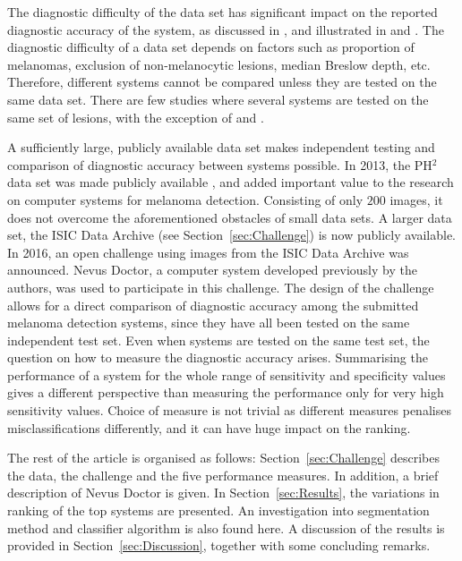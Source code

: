 \documentclass[10pt,letterpaper]{article}
\begin{document}
The diagnostic difficulty of the data set has significant impact on the reported diagnostic accuracy of the system, as discussed in \cite{Rosado2003Accuracy}, and illustrated in \cite{Malvehy2014Clinical} and \cite{Mollersen2015Computeraided}. 
The diagnostic difficulty of a data set depends on factors such as proportion of melanomas, exclusion of non-melanocytic lesions, median Breslow depth, etc. 
Therefore, different systems cannot be compared unless they are tested on the same data set. 
There are few studies where several systems are tested on the same set of lesions, with the exception of \cite{Perrinaud2007Can} and \cite{Mollersen2015Computeraided}. 

A sufficiently large, publicly available data set makes independent testing and comparison of diagnostic accuracy between systems possible. 
In 2013, the PH$^2$ data set was made publicly available \cite{Mendonca2013PH2}, and added important value to the research on computer systems for melanoma detection. 
Consisting of only $200$ images, it does not overcome the aforementioned obstacles of small data sets. 
A larger data set, the ISIC Data Archive (see Section~\ref{sec:Challenge}) is now publicly available. 
In 2016, an open challenge using images from the ISIC Data Archive was announced. 
Nevus Doctor, a computer system developed previously by the authors, was used to participate in this challenge.
The design of the challenge allows for a direct comparison of diagnostic accuracy among the submitted melanoma detection systems, since they have all been tested on the same independent test set. 
Even when systems are tested on the same test set, the question on how to measure the diagnostic accuracy arises. 
Summarising the performance of a system for the whole range of sensitivity and specificity values gives a different perspective than measuring the performance only for very high sensitivity values. 
Choice of measure is not trivial as different measures penalises misclassifications differently, and it can have huge impact on the ranking. 

The rest of the article is organised as follows: Section~\ref{sec:Challenge} describes the data, the challenge and the five performance measures. In addition, a brief description of Nevus Doctor is given. In Section~\ref{sec:Results}, the variations in ranking of the top systems are presented. An investigation into segmentation method and classifier algorithm is also found here. A discussion of the results is provided in Section~\ref{sec:Discussion}, together with some concluding remarks. 
\end{document}

